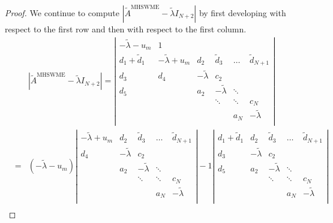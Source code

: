 \documentclass[a4paper, 11pt]{article}
\begin{document}
\begin{proof}
    We continue to compute $\left| \widetilde{A}^{\textrm{MHSWME}} - \widetilde{\lambda} I_{N+2} \right|$ by first developing with respect to the first row and then with respect to the first column.
    \begin{eqnarray*}
    && \left| \widetilde{A}^{\textrm{MHSWME}} - \widetilde{\lambda} I_{N+2} \right| = \left|
        \begin{array}{cccccc}
            -\widetilde{\lambda} - u_m  & 1 &  &  &  & \\
            d_1+\widetilde{d}_{1} & -\widetilde{\lambda} + u_m & d_2 & \widetilde{d}_{3} & \dots & \widetilde{d}_{{N+1}}\\
            d_3 & d_4 & -\widetilde{\lambda} & c_2  &  &   \\
            d_5 &  & a_2 & -\widetilde{\lambda} & \ddots  &   \\
            &  &  & \ddots & \ddots & c_N \\
            &  &  &  & a_N & -\widetilde{\lambda}  \\
        \end{array}
        \right| \\
      &=& (-\widetilde{\lambda} - u_m)
      \left|
        \begin{array}{ccccc}
            -\widetilde{\lambda} + u_m & d_2 & \widetilde{d}_{3} & \dots & \widetilde{d}_{{N+1}}\\
            d_4 & -\widetilde{\lambda} & c_2  &  &   \\
            & a_2 & -\widetilde{\lambda} & \ddots  &   \\
            &  & \ddots & \ddots & c_N \\
            &  &  & a_N & -\widetilde{\lambda}   \\
        \end{array}
        \right|
        -1 \left|
        \begin{array}{ccccc}
            d_1+\widetilde{d}_{{1}} & d_2 & \widetilde{d}_{3} & \dots & \widetilde{d}_{{N+1}}\\
            d_3 &  -\widetilde{\lambda} & c_2  &  &   \\
            d_5 & a_2 & -\widetilde{\lambda} & \ddots  &   \\
            &   & \ddots & \ddots & c_N \\
            &   &  & a_N & -\widetilde{\lambda}   \\
        \end{array}
        \right| \\

\end{eqnarray*}
\end{proof}
\end{document}
